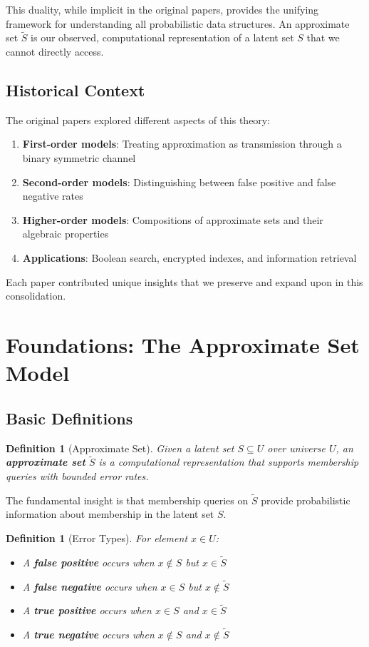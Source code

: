 \documentclass[11pt]{article}
\newtheorem{definition}[theorem]{Definition}
\newcommand{\observed}[1]{\tilde{#1}}  %
\begin{document}
This duality, while implicit in the original papers, provides the unifying framework for understanding all probabilistic data structures. An approximate set $\observed{S}$ is our observed, computational representation of a latent set $S$ that we cannot directly access.

\subsection{Historical Context}

The original papers explored different aspects of this theory:
\begin{enumerate}
\item \textbf{First-order models}: Treating approximation as transmission through a binary symmetric channel
\item \textbf{Second-order models}: Distinguishing between false positive and false negative rates
\item \textbf{Higher-order models}: Compositions of approximate sets and their algebraic properties
\item \textbf{Applications}: Boolean search, encrypted indexes, and information retrieval
\end{enumerate}

Each paper contributed unique insights that we preserve and expand upon in this consolidation.

\section{Foundations: The Approximate Set Model}
\label{sec:foundations}

\subsection{Basic Definitions}

\begin{definition}[Approximate Set]
Given a latent set $S \subseteq U$ over universe $U$, an \textbf{approximate set} $\observed{S}$ is a computational representation that supports membership queries with bounded error rates.
\end{definition}

The fundamental insight is that membership queries on $\observed{S}$ provide probabilistic information about membership in the latent set $S$.

\begin{definition}[Error Types]
For element $x \in U$:
\begin{itemize}
\item A \textbf{false positive} occurs when $x \notin S$ but $x \in \observed{S}$
\item A \textbf{false negative} occurs when $x \in S$ but $x \notin \observed{S}$
\item A \textbf{true positive} occurs when $x \in S$ and $x \in \observed{S}$
\item A \textbf{true negative} occurs when $x \notin S$ and $x \notin \observed{S}$
\end{itemize}
\end{definition}
\end{document}
